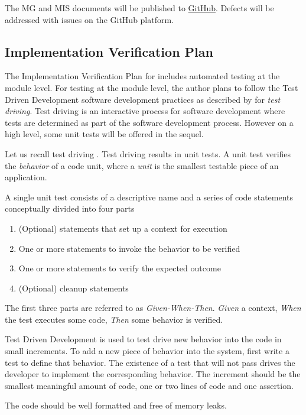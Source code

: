 \documentclass[12pt, titlepage]{article}
\begin{document}
The MG and MIS documents will be published to \href{https://github.com/JohnErnsthausen/roc}{GitHub}.
Defects will be addressed with issues on the GitHub platform.

\subsection{Implementation Verification Plan}

The Implementation Verification Plan for  includes automated testing at the module level.
For testing at the module level, the author plans to follow the Test Driven Development
software development practices as described by \cite{langr2013} for {\it test driving}.
Test driving is an interactive process for software development where tests are determined
as part of the software development process. However on a high level, some unit tests
will be offered in the sequel.

Let us recall test driving \cite{langr2013}.
Test driving results in unit tests. A unit test verifies the {\it behavior} of a code unit,
where a {\it unit} is the smallest testable piece of an application.

A single unit test consists of a descriptive name and a series of code statements conceptually
divided into four parts

\begin{enumerate}
  \item (Optional) statements that set up a context for execution
  \item One or more statements to invoke the behavior to be verified
  \item One or more statements to verify the expected outcome
  \item (Optional) cleanup statements
\end{enumerate}

The first three parts are referred to as {\it Given-When-Then}. {\it Given} a context, {\it When}
the test executes some code, {\it Then} some behavior is verified.

Test Driven Development is used to test drive new behavior into the code in small increments. To
add a new piece of behavior into the system, first write a test to define that behavior. The
existence of a test that will not pass drives the developer to implement the corresponding behavior.
The increment should be the smallest meaningful amount of code, one or two lines of code and one assertion.

The code should be well formatted and free of memory leaks.
\end{document}

